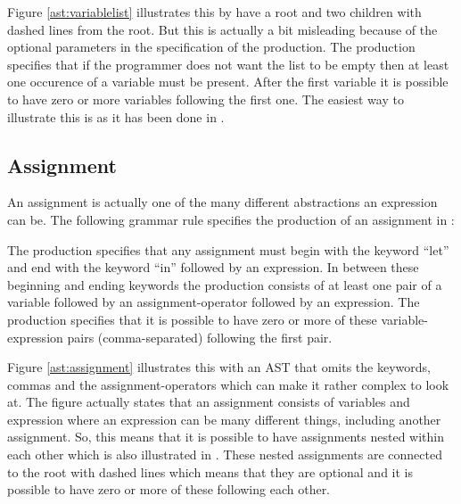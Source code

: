 

Figure \ref{ast:variablelist} illustrates this by have a root and two children with dashed lines from the root. But this is actually a bit misleading because of the optional parameters in the specification of the production. The production specifies that if the programmer does not want the list to be empty then at least one occurence of a variable must be present. After the first variable it is possible to have zero or more variables following the first one. The easiest way to illustrate this is as it has been done in .

\subsection{Assignment}

An assignment is actually one of the many different abstractions an expression can be. The following grammar rule specifies the production of an assignment in \productname{}:

\begin{ebnf}
\end{ebnf}


The production specifies that any assignment must begin with the keyword ``let'' and end with the keyword ``in'' followed by an expression. In between these beginning and ending keywords the production consists of at least one pair of a variable followed by an assignment-operator followed by an expression. The production specifies that it is possible to have zero or more of these variable-expression pairs (comma-separated) following the first pair. 



Figure \ref{ast:assignment} illustrates this with an AST that omits the keywords, commas and the assignment-operators which can make it rather complex to look at. The figure actually states that an assignment consists of variables and expression where an expression can be many different things, including another assignment. So, this means that it is possible to have assignments nested within each other which is also illustrated in . These nested assignments are connected to the root with dashed lines which means that they are optional and it is possible to have zero or more of these following each other.

